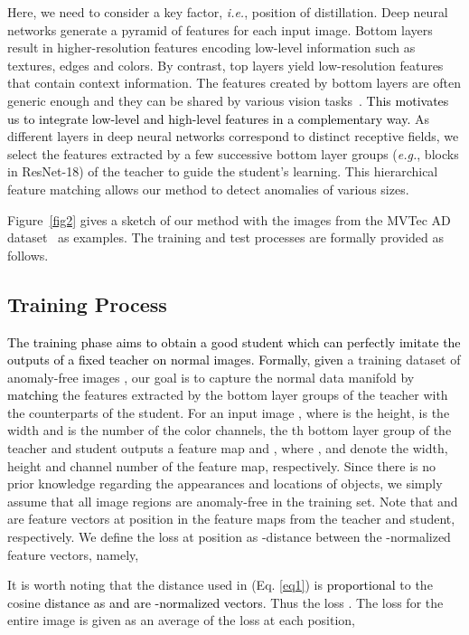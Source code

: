 \documentclass{bmvc2k}
\def\ie{\emph{i.e.}} \def\Ie{\emph{I.e}}
\newcommand{\wgd}[1]{\textcolor{black}{{}#1}}
\begin{document}
Here, we need to consider a key factor, \ie, position of distillation. Deep neural networks generate a pyramid of features for each input image. Bottom layers result in higher-resolution features encoding low-level information such as textures, edges and colors. By contrast, top layers yield low-resolution features that contain context information. The features created by bottom layers are often generic enough and they can be shared by various vision tasks~\cite{Oquab2014,Zeiler2014}. \wgd{This motivates us to integrate low-level and high-level features in a complementary way.} As different layers in deep neural networks correspond to distinct receptive fields, we select the features extracted by a few successive bottom layer groups (\textit{e.g.}, blocks in ResNet-18) of the teacher to guide the student's learning. This hierarchical feature matching allows our method to detect anomalies of various sizes.

Figure~\ref{fig2} gives a sketch of our method with the images from the MVTec AD dataset~\cite{Bergmann2020} as examples. The training and test processes are formally provided as follows.

\subsection{Training Process}
\label{sec3-sub1}

\wgd{The training phase aims to obtain a good student which can perfectly imitate the outputs of a fixed teacher on normal images. Formally, given} a training dataset of anomaly-free images , our goal is to capture the normal data manifold by \wgd{matching} the features extracted by the  bottom layer groups of the teacher with the counterparts of the student. For an input image , where  is the height,  is the width and  is the number of the color channels, the th bottom layer group of the teacher and student outputs a feature map  and , where ,  and  denote the width, height and channel number of the feature map, respectively. Since there is no prior knowledge regarding the appearances and locations of objects, we simply assume that all image regions are anomaly-free in the training set. Note that  and   are feature vectors at position  in the feature maps from the teacher and student, respectively. We define the loss at position  as -distance between the -normalized feature vectors, namely,



It is worth noting that the  distance used in (Eq. \ref{eq1}) is \wgd{proportional} to the cosine \wgd{distance as  and  are -normalized vectors}. Thus the loss . The loss for the entire image  is given as an average of the loss at each position,
\end{document}
